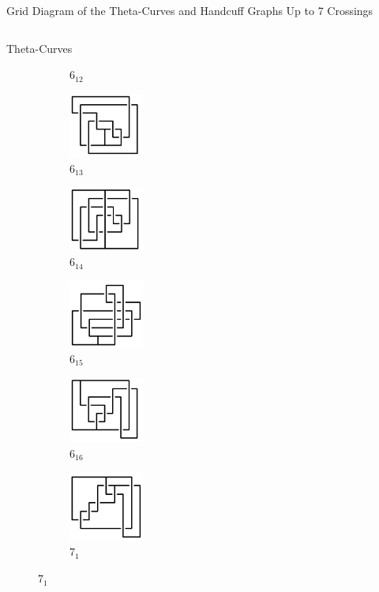 \documentclass[final]{beamer}
\begin{document}
\begin{frame}[t]
\begin{alertblock}{Grid Diagram of the Theta-Curves and Handcuff Graphs Up to 7 Crossings}
\begin{columns}[t]
\begin{column}{0.7\textwidth}
\begin{alertblock}{Theta-Curves}
\begin{figure}
\begin{subfigure}{0.075\textwidth}
    \caption{$6_{12}$} 
    \end{subfigure}
    \begin{subfigure}{0.075\textwidth}
    \includegraphics[width=2.5cm]{../Midterm_Poster/grid_diagram/theta_6_13.png}
    \caption{$6_{13}$} 
    \end{subfigure}
    \begin{subfigure}{0.075\textwidth}
    \includegraphics[width=2.5cm]{../Midterm_Poster/grid_diagram/theta_6_14.png}
    \caption{$6_{14}$} 
    \end{subfigure}
    \begin{subfigure}{0.075\textwidth}
    \includegraphics[width=2.5cm]{../Midterm_Poster/grid_diagram/theta_6_15.png}
    \caption{$6_{15}$} 
    \end{subfigure}
    \begin{subfigure}{0.075\textwidth}
    \includegraphics[width=2.5cm]{../Midterm_Poster/grid_diagram/theta_6_16.png}
    \caption{$6_{16}$} 
    \end{subfigure}
    \begin{subfigure}{0.075\textwidth}
    \includegraphics[width=2.5cm]{../Midterm_Poster/grid_diagram/theta_7_1.png}
    \caption{$7_{1}$} 
    \end{subfigure}

\end{figure}
\end{alertblock}
\end{column}
\end{columns}
\end{alertblock}
\end{frame}
\end{document}
